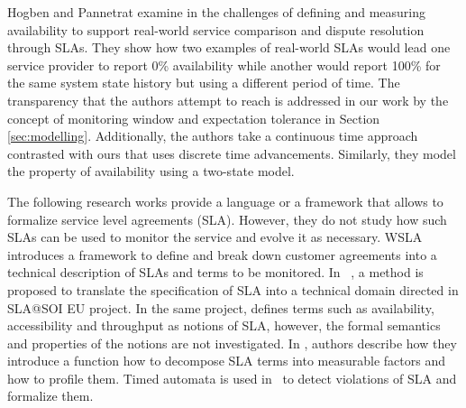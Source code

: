 
Hogben and Pannetrat examine in \cite{hogben2013defavail} the challenges of defining and measuring availability to support real-world service comparison and dispute resolution through SLAs.
They show how two examples of real-world SLAs would lead one service provider to report 0\% availability while another would report 100\% for the same system state history but using a different period of time.
The transparency that the authors attempt to reach is addressed in our work by the concept of monitoring window and expectation tolerance in Section \ref{sec:modelling}.
Additionally, the authors take a continuous time approach contrasted with ours that uses discrete time advancements.
Similarly, they model the property of availability using a two-state model.

The following research works provide a language or a framework that allows to formalize service level agreements (SLA).
However, they do not study how such SLAs can be used to monitor the service and evolve it as necessary.
WSLA~\cite{keller2003wsla} introduces a framework to define and break down customer agreements into a technical description of SLAs and terms to be monitored.
In ~\cite{mahbub2011translationsla}, a method is proposed to translate the specification of SLA into a technical domain directed in SLA@SOI EU project.
In the same project, \cite{comuzzi2009defavail} defines terms such as availability, accessibility and throughput as notions of SLA, however, the formal semantics and properties of the notions are not investigated.
In \cite{chen2007sladecompose}, authors describe how they introduce a function how to decompose SLA terms into measurable factors and how to profile them.
Timed automata is used in~\cite{raimondi2008fsmsla} to detect violations of SLA and formalize them.

